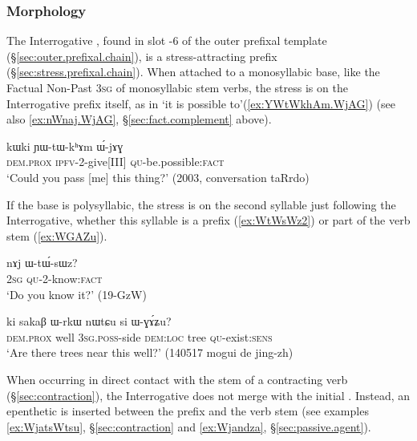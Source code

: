  \subsubsection{Morphology} \label{sec:interrogative.W.morpho} 
 The Interrogative , found in slot -6 of the outer prefixal template (§\ref{sec:outer.prefixal.chain}), is a stress-attracting prefix (§\ref{sec:stress.prefixal.chain}). When attached to a monosyllabic base, like the Factual Non-Past \textsc{3sg} of monosyllabic stem verbs, the stress is on the Interrogative prefix itself, as in  `it is possible to'(\ref{ex:YWtWkhAm.WjAG}) (see also \ref{ex:nWnaj.WjAG}, §\ref{sec:fact.complement} above).
 
\begin{exe}
\ex \label{ex:YWtWkhAm.WjAG}
 \gll kɯki ɲɯ-tɯ-kʰɤm ɯ́-jɤɣ \\
 \textsc{dem}.\textsc{prox} \textsc{ipfv}-2-give[III] \textsc{qu}-be.possible:\textsc{fact} \\
\glt `Could you pass [me] this thing?' (2003, conversation taRrdo)
\end{exe}

If the base is polysyllabic, the stress is on the second syllable just following the Interrogative, whether this syllable is a prefix (\ref{ex:WtWsWz2}) or part of the verb stem (\ref{ex:WGAZu}).

\begin{exe}
\ex \label{ex:WtWsWz2}
 \gll nɤj ɯ-tɯ́-sɯz? \\
\textsc{2sg} \textsc{qu}-2-know:\textsc{fact} \\
\glt `Do you know it?' (19-GzW)  
\end{exe}

\begin{exe}
\ex \label{ex:WGAZu}
 \gll ki sakaβ ɯ-rkɯ nɯtɕu si ɯ-ɣɤ́ʑu? \\
 \textsc{dem}.\textsc{prox} well \textsc{3sg}.\textsc{poss}-side \textsc{dem}:\textsc{loc} tree \textsc{qu}-exist:\textsc{sens} \\
 \glt `Are there trees near this well?' (140517 mogui de jing-zh)
\end{exe}

When occurring in direct contact with the stem of a contracting verb (§\ref{sec:contraction}), the Interrogative  does not merge with the initial . Instead, an epenthetic  is inserted between the prefix and the verb stem (see examples \ref{ex:WjatsWtsu},  §\ref{sec:contraction} and \ref{ex:Wjandza}, §\ref{sec:passive.agent}).




